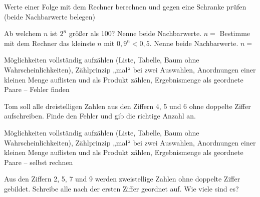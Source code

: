 \begin{aufgabe}{Werte einer Folge mit dem Rechner berechnen und gegen eine Schranke prüfen (beide Nachbarwerte belegen)}
\begin{teile}
\teil Ab welchem $n$ ist $2^n$ größer als 100? Nenne beide Nachbarwerte. $n = $ \leerfeld
\teil Bestimme mit dem Rechner das kleinste $n$ mit $0{,}9^n < 0{,}5$. Nenne beide Nachbarwerte. $n = $ \leerfeld
\end{teile}
\end{aufgabe}

\begin{aufgabe}{Möglichkeiten vollständig aufzählen (Liste, Tabelle, Baum ohne Wahrscheinlichkeiten), Zählprinzip „mal“ bei zwei Auswahlen, Anordnungen einer kleinen Menge auflisten und als Produkt zählen, Ergebnismenge als geordnete Paare – Fehler finden}
\begin{teile}
\teil Tom soll alle dreistelligen Zahlen aus den Ziffern 4, 5 und 6 ohne doppelte Ziffer aufschreiben. Finde den Fehler und gib die richtige Anzahl an. 
\end{teile}
\end{aufgabe}

\begin{aufgabe}{Möglichkeiten vollständig aufzählen (Liste, Tabelle, Baum ohne Wahrscheinlichkeiten), Zählprinzip „mal“ bei zwei Auswahlen, Anordnungen einer kleinen Menge auflisten und als Produkt zählen, Ergebnismenge als geordnete Paare – selbst rechnen}
\begin{teile}
\teil Aus den Ziffern 2, 5, 7 und 9 werden zweistellige Zahlen ohne doppelte Ziffer gebildet. Schreibe alle nach der ersten Ziffer geordnet auf. Wie viele sind es? \leerfeld
\end{teile}
\end{aufgabe}
